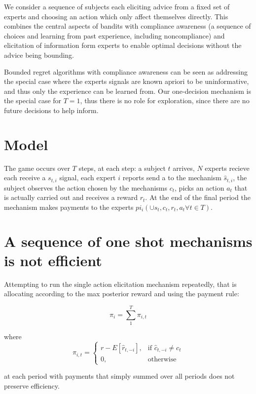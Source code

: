 

We consider a sequence of subjects each eliciting advice from a fixed set of experts and choosing an action which only affect themselves directly. This combines the central aspects of bandits with compliance awareness (a sequence of choices and learning from past experience, including noncompliance) and elicitation of information form experts to enable optimal decisions without the advice being bounding. 

Bounded regret algorithms with compliance awareness can be seen as addressing the special case where the experts signals are known apriori to be uninformative, and thus only the experience can be learned from. Our one-decision mechanism is the special case for $T={1}$, thus there is no role for exploration, since there are no future decisions  to help inform.
\section{Model}

The game occurs over $T$ steps, at each step: a subject $t$ arrives, $N$ experts recieve each receive a $s_{t,i}$ signal, each expert $i$ reports send a to the mechanism $\hat{s}_{t,i}$, the subject observes the action chosen by the mechanisms $c_t$, picks an action $a_t$ that is actually carried out and receives a reward $r_t$.
At the end of the final period the mechanism makes payments to the experts $pi_i( \cup \hat{s}_t,c_t,r_t,a_t \forall t \in T)$.

\section{A sequence of one shot mechanisms is not efficient}

Attempting to run the single action elicitation mechanism repeatedly, that is allocating according to the max posterior reward and using the payment rule:

\[
    \pi_i = \sum_1^T \pi_{i,t} 
\]

where 
\[
    \pi_{i,t} =
\begin{cases}
    r - E[\hat{r}_{t,-i}] ,& \text{if } \hat{c}_{t,-i} \neq c_t\\
    0,              & \text{otherwise}
\end{cases}
\]

 at each period with payments that simply summed over all periods does not preserve efficiency.

